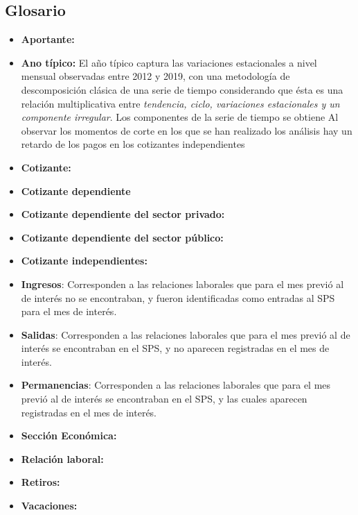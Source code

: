 \FloatBarrier
\subsection{Glosario}\label{fig:anexo:glosario}

\begin{itemize}
    \item \textbf{Aportante:}
    \item \textbf{Ano típico:} El año típico captura las variaciones estacionales a nivel mensual observadas entre 2012 y 2019, con una metodología de descomposición clásica de una serie de tiempo considerando que ésta es una relación multiplicativa entre \textit{tendencia, ciclo, variaciones estacionales y un componente irregular}. Los componentes de la serie de tiempo se obtiene Al observar los momentos de corte en los que se han realizado los análisis hay un retardo de los pagos en los cotizantes independientes
    \item \textbf{Cotizante:} 
    \item \textbf{Cotizante dependiente}
    \item \textbf{Cotizante dependiente del sector privado:}     
    \item \textbf{Cotizante dependiente del sector público:}     
    \item \textbf{Cotizante independientes:}    
    \item \textbf{Ingresos}: Corresponden a las relaciones laborales que para el mes previó al de interés no se encontraban, y fueron identificadas como entradas al SPS para el mes de interés. 
    \item \textbf{Salidas}: Corresponden a las relaciones laborales que para el mes previó al de interés se encontraban en el SPS, y no aparecen registradas en el mes de interés. 
    \item \textbf{Permanencias}: Corresponden a las relaciones laborales que para el mes previó al de interés se encontraban en el SPS, y las cuales aparecen registradas en el mes de interés.     
    \item \textbf{Sección Económica:}         
    \item \textbf{Relación laboral:} 
    \item \textbf{Retiros:}    
    \item \textbf{Vacaciones:}
\end{itemize}



